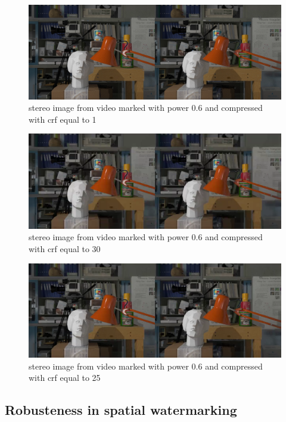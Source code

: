 \begin{figure}[h!]
\centering
\includegraphics[width=1\textwidth]{./img/06_crf1_gt.png}
\caption{\small{stereo image from video marked with power 0.6 and compressed with crf equal to 1 }}
\label{fig:06crf1}
\end{figure}
\begin{figure}[h!]
\centering
\includegraphics[width=1\textwidth]{./img/06_crf30_gt.png}
\caption{\small{stereo image from video marked with power 0.6 and compressed with crf equal to 30 }}
\label{fig:06crf30}
\end{figure}
\begin{figure}[h!]
\centering
\includegraphics[width=1\textwidth]{./img/06_crf25_gt.png}
\caption{\small{stereo image from video marked with power 0.6 and compressed with crf equal to 25 }}
\label{fig:06crf25}
\end{figure}


\subsection{Robusteness in spatial watermarking}

